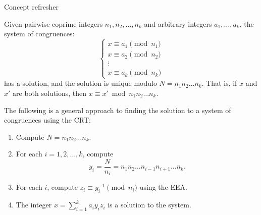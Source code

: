 \documentclass{practice}
\begin{document}
\newpage

\begin{center}
  Concept refresher
\end{center}

\begin{tcolorbox}[title=Chinese Remainder Theorem (CRT)]
  Given pairwise coprime integers $n_1, n_2, \dots, n_k$ and arbitrary integers $a_1, \dots, a_k$, the system of congruences:
  \[
    \begin{cases}
      x \equiv a_1 \pmod{n_1}\\
      x \equiv a_2 \pmod{n_2}\\
      \vdots\\
      x \equiv a_k \pmod{n_k}
    \end{cases}
  \]
  has a solution, and the solution is unique modulo $N = n_1n_2\dots n_k$.
  That is, if $x$ and $x'$ are both solutions, then $x \equiv x' \bmod{n_1n_2\dots n_k}$.
\end{tcolorbox}

The following is a general approach to finding the solution to a system of congruences using the CRT:
\begin{enumerate}
  \item Compute $N = n_1n_2\dots n_k$.
  \item For each $i=1,2,\dots,k$, compute
  \[
    y_i = \frac{N}{n_i} = n_1n_2\dots n_{i-1}n_{i+1}\dots n_k.
  \]
  \item For each $i$, compute $z_i \equiv y_i^{-1} \pmod{n_i}$ using the EEA.
  \item The integer $x = \sum_{i=1}^{k}a_iy_iz_i$ is a solution to the system.
\end{enumerate}
\end{document}
